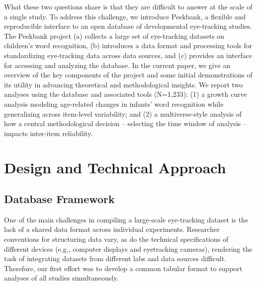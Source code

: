 \documentclass[
  english,
  man,floatsintext]{apa6}
\begin{document}
What these two questions share is that they are difficult to answer at the scale of a single study.
To address this challenge, we introduce Peekbank, a flexible and reproducible interface to an open database of developmental eye-tracking studies.
The Peekbank project (a) collects a large set of eye-tracking datasets on children's word recognition, (b) introduces a data format and processing tools for standardizing eye-tracking data across data sources, and (c) provides an interface for accessing and analyzing the database.
In the current paper, we give an overview of the key components of the project and some initial demonstrations of its utility in advancing theoretical and methodological insights.
We report two analyses using the database and associated tools (N=1,233): (1) a growth curve analysis modeling age-related changes in infants' word recognition while generalizing across item-level variability; and (2) a multiverse-style analysis of how a central methodological decision -- selecting the time window of analysis -- impacts inter-item reliability.

\hypertarget{design-and-technical-approach}{%
\section{Design and Technical Approach}\label{design-and-technical-approach}}

\hypertarget{database-framework}{%
\subsection{Database Framework}\label{database-framework}}

One of the main challenges in compiling a large-scale eye-tracking dataset is the lack of a shared data format across individual experiments.
Researcher conventions for structuring data vary, as do the technical specifications of different devices (e.g., computer displays and eyetracking cameras), rendering the task of integrating datasets from different labs and data sources difficult.
Therefore, our first effort was to develop a common tabular format to support analyses of all studies simultaneously.
\end{document}

